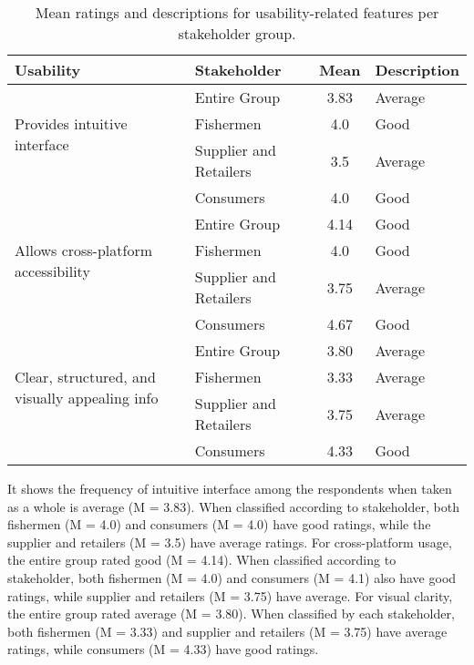 	\begin{table}[h]
		\centering
		\begin{tabular}{|l|l|c|l|}
			\hline
			\textbf{Usability} & \textbf{Stakeholder} & \textbf{Mean} & \textbf{Description} \\ \hline
			\multirow{3}{*}{Provides intuitive interface} 
			& Entire Group & 3.83 & Average \\ \cline{2-4}
			& Fishermen & 4.0 & Good \\ \cline{2-4}
			& Supplier and Retailers & 3.5 & Average \\ \cline{2-4}
			& Consumers & 4.0 & Good \\ \hline
			
			\multirow{3}{*}{Allows cross-platform accessibility} 
			& Entire Group & 4.14 & Good \\ \cline{2-4}
			& Fishermen & 4.0 & Good \\ \cline{2-4}
			& Supplier and Retailers & 3.75 & Average \\ \cline{2-4}
			& Consumers & 4.67 & Good \\ \hline
			
			\multirow{3}{*}{Clear, structured, and visually appealing info} 
			& Entire Group & 3.80 & Average \\ \cline{2-4}
			& Fishermen & 3.33 & Average \\ \cline{2-4}
			& Supplier and Retailers & 3.75 & Average \\ \cline{2-4}
			& Consumers & 4.33 & Good \\ \hline
			
		\end{tabular}
		\caption{Mean ratings and descriptions for usability-related features per stakeholder group.}
		\label{tab:usability}
	\end{table}
	
	It shows the frequency of intuitive interface among the respondents when taken as a whole is average (M = 3.83). When classified according to stakeholder, both fishermen (M = 4.0) and consumers (M = 4.0) have good ratings, while the supplier and retailers (M = 3.5) have average ratings. For cross-platform usage, the entire group rated good (M = 4.14). When classified according to stakeholder, both fishermen (M = 4.0) and consumers (M = 4.1) also have good ratings, while supplier and retailers (M = 3.75) have average. For visual clarity, the entire group rated average (M = 3.80). When classified by each stakeholder, both fishermen (M = 3.33) and supplier and retailers (M = 3.75) have average ratings, while consumers (M = 4.33)  have good ratings.
	
